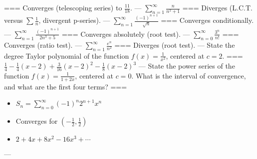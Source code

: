 ===
Converges (telescoping series) to $\frac{11}{18}$.
---
$\sum_{n=1}^\infty\frac{n}{n^2+1}$
===
Diverges (L.C.T. versus $\sum\frac{1}{n}$, divergent p-series).
---
$\sum_{n=1}^\infty\frac{(-1)^{n+1}}{\sqrt{n}}$
===
Converges conditionally.
---
$\sum_{n=1}^\infty\frac{(-1)^{n+1}}{2n^3+5}$
===
Converges absolutely (root test).
---
$\sum_{n=0}^\infty\frac{3^n}{n!}$
===
Converges (ratio test).
---
$\sum_{n=1}^\infty\frac{e^n}{n^2}$
===
Diverges (root test).
---
State the  degree Taylor polynomial of the function
$f(x)=\frac{1}{x^2}$,
centered at $c=2$.
===
$\frac{1}{4}-\frac{1}{4}(x-2)+\frac{3}{16}(x-2)^2-\frac{1}{8}(x-2)^3$
---
State the power series of the function
$f(x)=\frac{1}{1+2x}$,
centered at $c=0$. What is the interval of convergence, and what are the first
four terms?
===
\begin{itemize}
  \item $S_n=\sum_{n=0}^\infty(-1)^n 2^{n+1}x^n$
  \item Converges for $\left(-\frac{1}{2},\frac{1}{2}\right)$
  \item $2+4x+8x^2-16x^3+\cdots$
\end{itemize}
---
